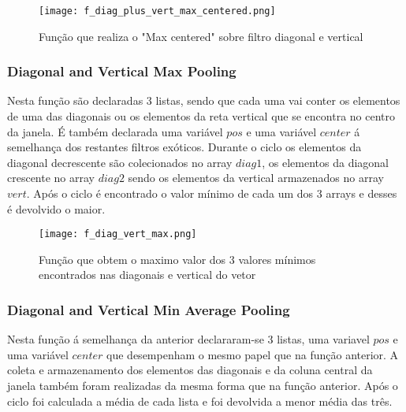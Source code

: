     \begin{figure}[H]

	  \centering
	  \captionsetup{justification=centering}

	  \texttt{[image: f\_diag\_plus\_vert\_max\_centered.png]}
	  
	  \caption {Função que realiza o "Max centered" sobre filtro diagonal e vertical}
    \end{figure}


\subsubsection{Diagonal and Vertical Max Pooling}\hfill\newline
  \hfill\newline
  	Nesta função são declaradas 3 listas, sendo que cada uma vai conter os elementos de uma das diagonais ou os elementos da reta vertical que se encontra no centro da janela. É também declarada uma variável $pos$ e uma variável $center$ á semelhança dos restantes filtros exóticos.\newline
  	Durante o ciclo os elementos da diagonal decrescente são colecionados no array $diag1$, os elementos da diagonal crescente no array $diag2$ sendo os elementos da vertical armazenados no array $vert$. \newline
  	Após o ciclo é encontrado o valor mínimo de cada um dos 3 arrays e desses é devolvido o maior.


	\begin{figure}[H]

	  \centering
	  \captionsetup{justification=centering}

	  \texttt{[image: f\_diag\_vert\_max.png]}
	  
	  \caption {Função que obtem o maximo valor dos 3 valores mínimos encontrados nas diagonais e vertical do vetor}
	\end{figure}


\subsubsection{Diagonal and Vertical Min Average Pooling}\hfill\newline
  \hfill\newline
  Nesta função á semelhança da anterior declararam-se 3 listas, uma variavel $pos$ e uma variável $center$ que desempenham o mesmo papel que na função anterior. A coleta e armazenamento dos elementos das diagonais e da coluna central da janela também foram realizadas da mesma forma que na função anterior.\newline
  Após o ciclo foi calculada a média de cada lista e foi devolvida a menor média das três.

